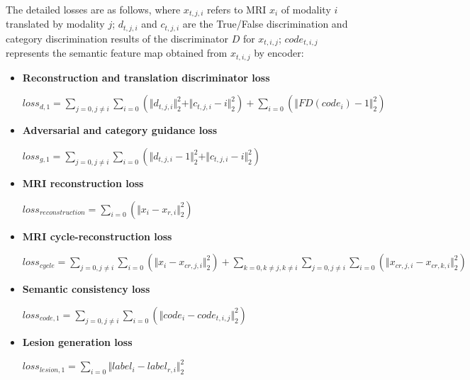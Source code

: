 \documentclass[letterpaper]{article} %
\begin{document}
The detailed losses are as follows, where $x_{t,j,i}$ refers to MRI $x_i$ of modality $i$ translated by modality $j$; $d_{t, j, i}$ and $c_{t, j, i}$ are the True/False discrimination and category discrimination results of the discriminator $D$ for $x_{t, i, j}$; $code_{t,i,j}$ represents the semantic feature map obtained from $x_{t,i,j}$ by encoder:
\begin{itemize}
	\item \textbf{Reconstruction and translation discriminator loss}
	\begin{center}
		$loss_{d,1}=\sum\limits_{j=0,j\neq i}\sum\limits_{i=0}(\Vert{d_{t,j,i}}\Vert_{2}^{2}+\Vert{c_{t,j,i}-i}\Vert_{2}^{2})+
		\sum\limits_{i=0}(\Vert{FD(code_{i})-1}\Vert_{2}^{2})$
	\end{center}
	
	\item \textbf{Adversarial and category guidance loss}
	\begin{center}
		$loss_{g,1}=\sum\limits_{j=0,j\neq i}\sum\limits_{i=0}(\Vert{d_{t,j,i}-1}\Vert_{2}^{2}+\Vert{c_{t,j,i}-i}\Vert_{2}^{2})$
	\end{center}
	
	\item \textbf{MRI reconstruction loss}
	\begin{center}
		$loss_{reconstruction}=\sum\limits_{i=0}(\Vert{x_i-x_{r,i}}\Vert_{2}^{2})$
	\end{center}
	
	\item \textbf{MRI cycle-reconstruction loss}
	\begin{center}
		$loss_{cycle}=\sum\limits_{j=0,j\neq i}\sum\limits_{i=0}(\Vert{x_i-x_{cr,j,i}}\Vert_{2}^{2})+\sum\limits_{k=0,k\neq j,k\neq i}\sum\limits_{j=0,j\neq i}\sum\limits_{i=0}(\Vert{x_{cr,j,i}-x_{cr,k,i}}\Vert_{2}^{2})$
	\end{center}
	
	\item \textbf{Semantic consistency loss}
	\begin{center}
		$loss_{code,1}=\sum\limits_{j=0,j\neq i}\sum\limits_{i=0}(\Vert{code_i-code_{t,i,j}}\Vert_{2}^{2})$
	\end{center}
	
	\item \textbf{Lesion generation loss}
	\begin{center}
		$loss_{lesion,1}=\sum\limits_{i=0}\Vert{label_i-label_{r,i}}\Vert_{2}^{2}$
	\end{center}
	
\end{itemize}
\end{document}
